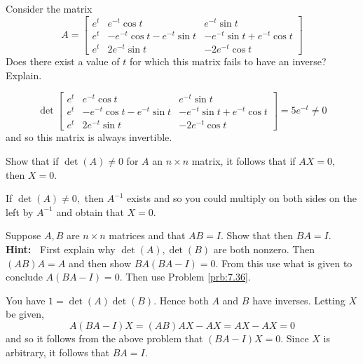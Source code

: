 \documentclass{ximera}
\begin{document}
\begin{problem}\label{prb:7.35} Consider the matrix
\begin{equation*}
A =
\left[
\begin{array}{ccc}
e^{t} & e^{-t}\cos t & e^{-t}\sin t \\
e^{t} & -e^{-t}\cos t-e^{-t}\sin t & -e^{-t}\sin t+e^{-t}\cos t \\
e^{t} & 2e^{-t}\sin t & -2e^{-t}\cos t
\end{array}
\right]
\end{equation*}
Does there exist a value of $t$ for which this matrix fails to have an
inverse? Explain.
\begin{hint}
\[
\det \left[
\begin{array}{ccc}
e^{t} & e^{-t}\cos t & e^{-t}\sin t \\
e^{t} & -e^{-t}\cos t-e^{-t}\sin t & -e^{-t}\sin t+e^{-t}\cos t \\
e^{t} & 2e^{-t}\sin t & -2e^{-t}\cos t%
\end{array}
\right] = 5e^{-t} \neq 0
\]
and so this matrix is always invertible.
\end{hint}
\end{problem}

\begin{problem}\label{prb:7.36} \label{exerdeterminant3}Show that if $\det \left( A\right) \neq 0$ for $A$
an $n\times n$ matrix, it follows that if $AX=0,$ then $X=0$.
\begin{hint}
If $\det \left( A\right) \neq 0,$ then $A^{-1}$ exists and so you could
multiply on both sides on the left by $A^{-1}$ and obtain that $X=0$.
\end{hint}
\end{problem}

\begin{problem}\label{prb:7.37} Suppose $A,B$ are $n\times n$ matrices and that $AB=I.$ Show that then
$BA=I.$ \textbf{Hint:\ } First explain why
$\det \left( A\right) ,\det \left( B\right) $ are both nonzero. Then $\left(
AB\right) A=A$ and then show $BA\left( BA-I\right) =0.$ From this use what
is given to conclude $A\left( BA-I\right) =0.$ Then use Problem
\ref{prb:7.36}.
\begin{hint}
You have $1=\det \left( A\right) \det \left( B\right) $.
Hence both $A$ and $B$ have inverses. Letting $X$ be given,
\[
A\left( BA-I\right) X=\left( AB\right) AX-AX=AX-AX = 0
\]
and so it follows from the above problem that $\left( BA-I\right)X=0.$ Since $X$ is arbitrary, it follows that $BA=I.$
\end{hint}
\end{problem}
\end{document}

